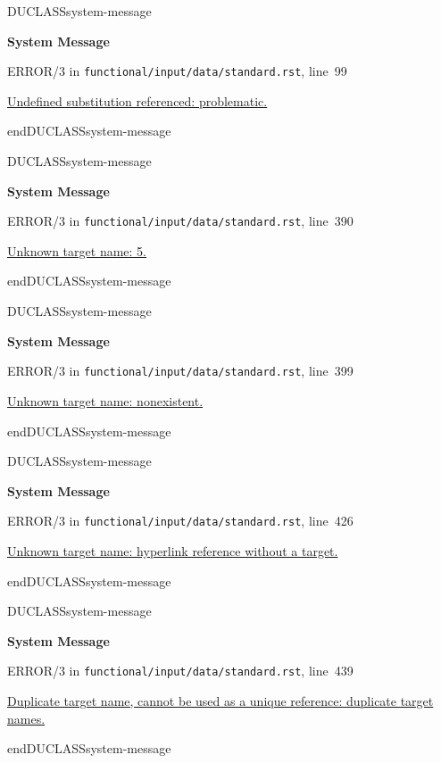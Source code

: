 \documentclass[a4paper]{article}
\newenvironment{DUclass}[1]%
    {%
     \def\DocutilsClassFunctionName{DUCLASS#1}
     \csname \DocutilsClassFunctionName \endcsname}%
    {\csname end\DocutilsClassFunctionName \endcsname}%
\newenvironment{DUadmonition}%
    {\begin{center}
       \begin{lrbox}{\DUadmonitionbox}
         \begin{minipage}{0.9\linewidth}
    }%
    {    \end{minipage}
       \end{lrbox}
       \fbox{\usebox{\DUadmonitionbox}}
     \end{center}
    }
\providecommand*{\DUtitle}[1]{%
  \smallskip\noindent\textbf{#1}\smallskip}
\begin{document}
\begin{DUclass}{system-message}
\begin{DUadmonition}
\DUtitle{\color{red}System Message}

ERROR/3 in \texttt{functional/input/data/standard.rst}, line~99

\hyperlink{problematic-1}{
Undefined substitution referenced: \textquotedbl{}problematic\textquotedbl{}.
}
\end{DUadmonition}
\end{DUclass}

\begin{DUclass}{system-message}
\begin{DUadmonition}
\DUtitle{\color{red}System Message}

ERROR/3 in \texttt{functional/input/data/standard.rst}, line~390

\hyperlink{footnote-reference-8}{
Unknown target name: \textquotedbl{}5\textquotedbl{}.
}
\end{DUadmonition}
\end{DUclass}

\begin{DUclass}{system-message}
\begin{DUadmonition}
\DUtitle{\color{red}System Message}

ERROR/3 in \texttt{functional/input/data/standard.rst}, line~399

\hyperlink{citation-reference-3}{
Unknown target name: \textquotedbl{}nonexistent\textquotedbl{}.
}
\end{DUadmonition}
\end{DUclass}

\begin{DUclass}{system-message}
\begin{DUadmonition}
\DUtitle{\color{red}System Message}

ERROR/3 in \texttt{functional/input/data/standard.rst}, line~426

\hyperlink{problematic-2}{
Unknown target name: \textquotedbl{}hyperlink reference without a target\textquotedbl{}.
}
\end{DUadmonition}
\end{DUclass}

\begin{DUclass}{system-message}
\begin{DUadmonition}
\DUtitle{\color{red}System Message}

ERROR/3 in \texttt{functional/input/data/standard.rst}, line~439

\hyperlink{problematic-3}{
Duplicate target name, cannot be used as a unique reference: \textquotedbl{}duplicate target names\textquotedbl{}.
}
\end{DUadmonition}
\end{DUclass}
\end{document}
